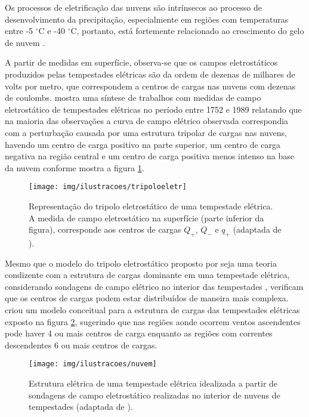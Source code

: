 Os processos de eletrificação das nuvens são intrínsecos ao processo de desenvolvimento da precipitação, especialmente em regiões com temperaturas entre -5 $^{\circ}$C e -40 $^{\circ}$C, portanto, está fortemente relacionado ao crescimento do gelo de nuvem \cite{mason1953}. 

A partir de medidas em superfície, observa-se que os campos eletrostáticos produzidos pelas tempestades elétricas são da ordem de dezenas de milhares de volts por metro, que correspondem a centros de cargas nas nuvens com dezenas de coulombs. 
 mostra uma síntese de trabalhos com medidas de campo eletrostático de tempestades elétricas no período entre 1752 e 1989 relatando que na maioria das observações a curva de campo elétrico observada correspondia com a perturbação causada por uma estrutura tripolar de cargas nas nuvens, havendo um centro de carga positivo na parte superior, um centro de carga negativa na região central e um centro de carga positiva menos intenso na base da nuvem conforme mostra a figura \ref{fig:tripeletr}.


\begin{figure}[ht]
\centering 
\texttt{[image: img/ilustracoes/tripoloeletr]}
\caption{Representação do tripolo eletrostático de uma tempestade elétrica. A medida de campo eletrostático na superfície (parte inferior da figura), corresponde aos centros de cargas $Q_{+}$, $Q_{-}$ e $q_{+}$ (adaptada de ).}
\label{fig:tripeletr}
\end{figure}

Mesmo que o modelo do tripolo eletrostático proposto por  seja uma teoria condizente com a estrutura de cargas dominante em uma tempestade elétrica, considerando sondagens de campo elétrico no interior das tempestades , verificam que os centros de cargas podem estar distribuídos de maneira mais complexa. 
 criou um modelo conceitual para a estrutura de cargas das tempestades elétricas exposto na figura \ref{fig:multipcentros}, sugerindo que nas regiões aonde ocorrem ventos ascendentes pode haver 4 ou mais centros de carga enquanto as regiões com correntes descendentes 6 ou mais centros de cargas.


\begin{figure}[ht]
\centering 
\texttt{[image: img/ilustracoes/nuvem]}
\caption{Estrutura elétrica de uma tempestade elétrica idealizada a partir de sondagens de campo eletrostático realizadas no interior de nuvens de tempestades (adaptada de ).}
\label{fig:multipcentros}
\end{figure}

